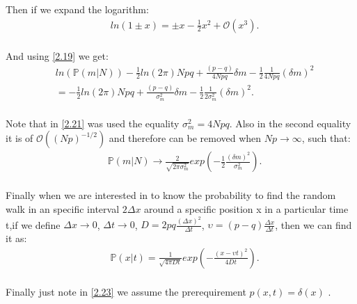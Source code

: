 \documentclass[12pt]{article}
\numberwithin{equation}{section}
\begin{document}
Then if we expand the logarithm: 
\begin{equation} \label{2.19}
    \begin{split}
          & ln(1 \pm x) = \pm x - \frac{1}{2} x^2 + \mathcal{O}(x^3).  \\
    \end{split}
\end{equation}

And using \ref{2.19} we get: 
\begin{equation} \label{2.21}
    \begin{split}
          & ln(\mathbb{P}(m | N)) -\frac{1}{2} ln(2\pi)Npq + \frac{(p - q)}{4Npq}\delta m - \frac{1}{2} \frac{1}{4Npq}(\delta m)^2  \\
          & = -\frac{1}{2} ln(2\pi)Npq + \frac{(p - q)}{\sigma^2_m} \delta m - \frac{1}{2} \frac{1}{2 \sigma^2_m}(\delta m)^2.  \\
    \end{split}
\end{equation}

Note that in \ref{2.21} was used the equality $\sigma^2_m = 4Npq$. Also in the second equality it is of $\mathcal{O}((Np)^{-1/2})$ and therefore can be removed when $Np \rightarrow \infty$, such that: 
\begin{equation} \label{2.22}
    \begin{split}
          & \mathbb{P}(m | N) \rightarrow \frac{2}{\sqrt{2\pi \sigma^2_m}}exp\left(-\frac{1}{2} \frac{(\delta m)^2}{\sigma^2_m}\right).   \\
    \end{split}
\end{equation}

Finally when we are interested in to know the probability to find the random walk in an specific interval $2\Delta x$ around a specific position x in a particular time t,if we define $\Delta x \rightarrow 0$, $\Delta t \rightarrow 0$, $D = 2pq \frac{(\Delta x)^2}{\Delta t}$, $\upsilon = (p - q)\frac{\Delta x}{\Delta t}$, then we can find it as: 
\begin{equation} \label{2.23}
    \begin{split}
           & \mathbb{P}(x | t) = \frac{1}{\sqrt{4\pi Dt}}exp\left(- \frac{(x-\upsilon t)^2}{4Dt}\right). \\
    \end{split}
\end{equation}

Finally just note in \ref{2.23} we assume the prerequirement $p(x, t) = \delta(x)$ \cite{mundy2014random}.
\end{document}
